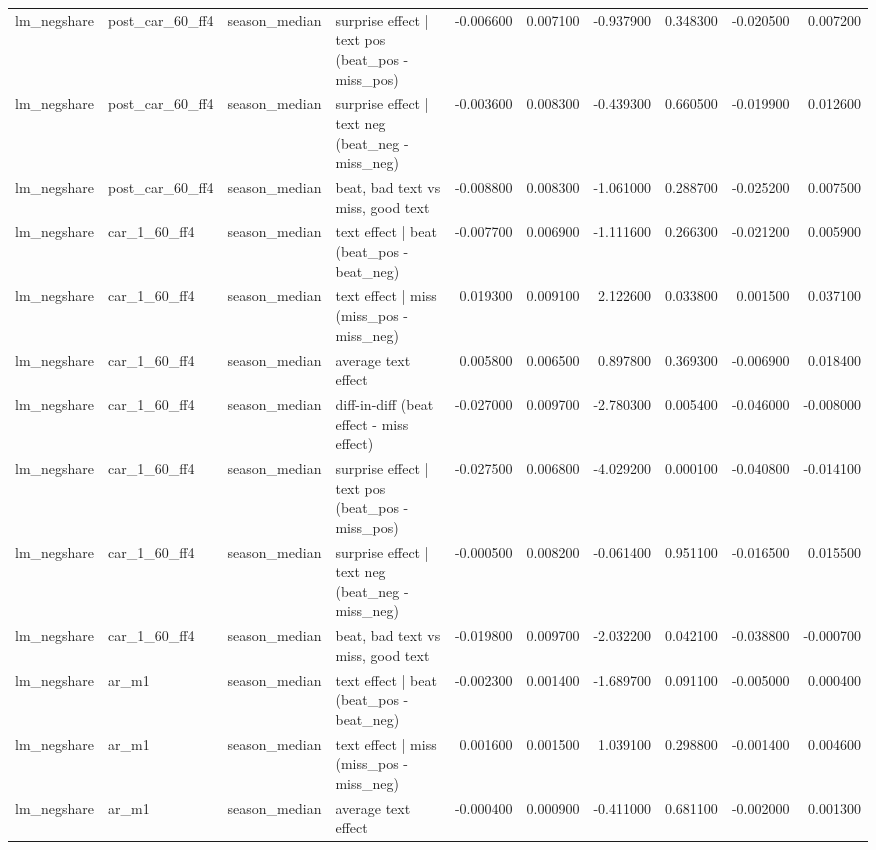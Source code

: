 \begin{table}
\begin{tabular}{llllrrrrrr}
lm\_negshare & post\_car\_60\_ff4 & season\_median & surprise effect | text pos (beat\_pos - miss\_pos) & -0.006600 & 0.007100 & -0.937900 & 0.348300 & -0.020500 & 0.007200 \\
lm\_negshare & post\_car\_60\_ff4 & season\_median & surprise effect | text neg (beat\_neg - miss\_neg) & -0.003600 & 0.008300 & -0.439300 & 0.660500 & -0.019900 & 0.012600 \\
lm\_negshare & post\_car\_60\_ff4 & season\_median & beat, bad text vs miss, good text & -0.008800 & 0.008300 & -1.061000 & 0.288700 & -0.025200 & 0.007500 \\
lm\_negshare & car\_1\_60\_ff4 & season\_median & text effect | beat  (beat\_pos - beat\_neg) & -0.007700 & 0.006900 & -1.111600 & 0.266300 & -0.021200 & 0.005900 \\
lm\_negshare & car\_1\_60\_ff4 & season\_median & text effect | miss  (miss\_pos - miss\_neg) & 0.019300 & 0.009100 & 2.122600 & 0.033800 & 0.001500 & 0.037100 \\
lm\_negshare & car\_1\_60\_ff4 & season\_median & average text effect & 0.005800 & 0.006500 & 0.897800 & 0.369300 & -0.006900 & 0.018400 \\
lm\_negshare & car\_1\_60\_ff4 & season\_median & diff-in-diff (beat effect - miss effect) & -0.027000 & 0.009700 & -2.780300 & 0.005400 & -0.046000 & -0.008000 \\
lm\_negshare & car\_1\_60\_ff4 & season\_median & surprise effect | text pos (beat\_pos - miss\_pos) & -0.027500 & 0.006800 & -4.029200 & 0.000100 & -0.040800 & -0.014100 \\
lm\_negshare & car\_1\_60\_ff4 & season\_median & surprise effect | text neg (beat\_neg - miss\_neg) & -0.000500 & 0.008200 & -0.061400 & 0.951100 & -0.016500 & 0.015500 \\
lm\_negshare & car\_1\_60\_ff4 & season\_median & beat, bad text vs miss, good text & -0.019800 & 0.009700 & -2.032200 & 0.042100 & -0.038800 & -0.000700 \\
lm\_negshare & ar\_m1 & season\_median & text effect | beat  (beat\_pos - beat\_neg) & -0.002300 & 0.001400 & -1.689700 & 0.091100 & -0.005000 & 0.000400 \\
lm\_negshare & ar\_m1 & season\_median & text effect | miss  (miss\_pos - miss\_neg) & 0.001600 & 0.001500 & 1.039100 & 0.298800 & -0.001400 & 0.004600 \\
lm\_negshare & ar\_m1 & season\_median & average text effect & -0.000400 & 0.000900 & -0.411000 & 0.681100 & -0.002000 & 0.001300 \\

\end{tabular}
\end{table}
